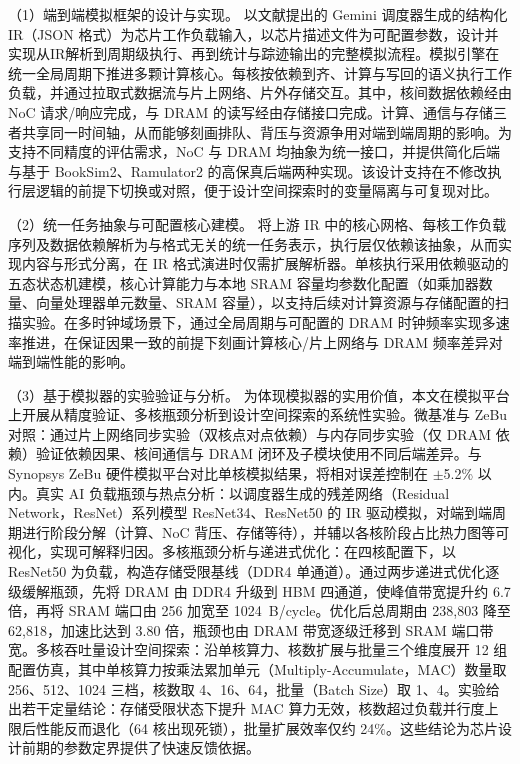 （1）端到端模拟框架的设计与实现。 以文献\parencite{cai2024gemini}提出的 Gemini 调度器生成的结构化 IR（JSON 格式）为芯片工作负载输入，以芯片描述文件为可配置参数，设计并实现从IR解析到周期级执行、再到统计与踪迹输出的完整模拟流程。模拟引擎在统一全局周期下推进多颗计算核心。每核按依赖到齐、计算与写回的语义执行工作负载，并通过拉取式数据流与片上网络、片外存储交互。其中，核间数据依赖经由 NoC 请求/响应完成，与 DRAM 的读写经由存储接口完成。计算、通信与存储三者共享同一时间轴，从而能够刻画排队、背压与资源争用对端到端周期的影响。为支持不同精度的评估需求，NoC 与 DRAM 均抽象为统一接口，并提供简化后端与基于 BookSim2、Ramulator2 的高保真后端两种实现。该设计支持在不修改执行层逻辑的前提下切换或对照，便于设计空间探索时的变量隔离与可复现对比。

（2）统一任务抽象与可配置核心建模。 将上游 IR 中的核心网格、每核工作负载序列及数据依赖解析为与格式无关的统一任务表示，执行层仅依赖该抽象，从而实现内容与形式分离，在 IR 格式演进时仅需扩展解析器。单核执行采用依赖驱动的五态状态机建模，核心计算能力与本地 SRAM 容量均参数化配置（如乘加器数量、向量处理器单元数量、SRAM 容量），以支持后续对计算资源与存储配置的扫描实验。在多时钟域场景下，通过全局周期与可配置的 DRAM 时钟频率实现多速率推进，在保证因果一致的前提下刻画计算核心/片上网络与 DRAM 频率差异对端到端性能的影响。

（3）基于模拟器的实验验证与分析。 为体现模拟器的实用价值，本文在模拟平台上开展从精度验证、多核瓶颈分析到设计空间探索的系统性实验。微基准与 ZeBu 对照：通过片上网络同步实验（双核点对点依赖）与内存同步实验（仅 DRAM 依赖）验证依赖因果、核间通信与 DRAM 闭环及子模块使用不同后端差异。与 Synopsys ZeBu 硬件模拟平台对比单核模拟结果，将相对误差控制在 $\pm$5.2\% 以内。真实 AI 负载瓶颈与热点分析：以调度器生成的残差网络（Residual Network，ResNet）系列模型 ResNet34、ResNet50 的 IR 驱动模拟，对端到端周期进行阶段分解（计算、NoC 背压、存储等待），并辅以各核阶段占比热力图等可视化，实现可解释归因。多核瓶颈分析与递进式优化：在四核配置下，以 ResNet50 为负载，构造存储受限基线（DDR4 单通道）。通过两步递进式优化逐级缓解瓶颈，先将 DRAM 由 DDR4 升级到 HBM 四通道，使峰值带宽提升约 6.7 倍，再将 SRAM 端口由 256 加宽至 \SI{1024}{B/cycle}。优化后总周期由 238,803 降至 62,818，加速比达到 3.80 倍，瓶颈也由 DRAM 带宽逐级迁移到 SRAM 端口带宽。多核吞吐量设计空间探索：沿单核算力、核数扩展与批量三个维度展开 12 组配置仿真，其中单核算力按乘法累加单元（Multiply-Accumulate，MAC）数量取 256、512、1024 三档，核数取 4、16、64，批量（Batch Size）取 1、4。实验给出若干定量结论：存储受限状态下提升 MAC 算力无效，核数超过负载并行度上限后性能反而退化（64 核出现死锁），批量扩展效率仅约 24\%。这些结论为芯片设计前期的参数定界提供了快速反馈依据。

